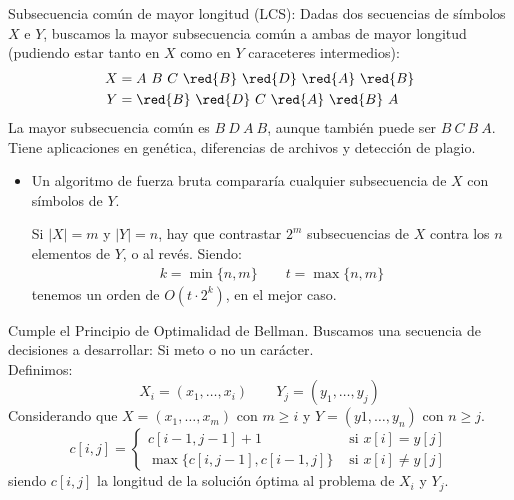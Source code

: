 \begin{ejemplo}
    Subsecuencia común de mayor longitud (LCS): Dadas dos secuencias de símbolos $X$ e $Y$, buscamos la mayor subsecuencia común a ambas de mayor longitud (pudiendo estar tanto en $X$ como en $Y$ caraceteres intermedios):
    \begin{align*}
        X &= A\ B\ C\ \red{B}\ \red{D}\ \red{A}\ \red{B} \\
        Y &= \red{B}\ \red{D}\ C\ \red{A}\ \red{B}\ A
    \end{align*}
    La mayor subsecuencia común es $B\ D\ A\ B$, aunque también puede ser $B\ C\ B\ A$.\newline
    Tiene aplicaciones en genética, diferencias de archivos y detección de plagio.\\

    \begin{itemize}
        \item Un algoritmo de fuerza bruta compararía cualquier subsecuencia de $X$ con símbolos de $Y$. 

            Si $|X| = m$ y $|Y| = n$, hay que contrastar $2^m$ subsecuencias de $X$ contra los $n$ elementos de $Y$, o al revés. Siendo:
            \begin{gather*}
                k = \min \{n,m\} \qquad t = \max\{n,m\}
            \end{gather*}
            tenemos un orden de $O(t\cdot 2^k)$, en el mejor caso.
    \end{itemize}
    Cumple el Principio de Optimalidad de Bellman. Buscamos una secuencia de decisiones a desarrollar: Si meto o no un carácter.\\

    Definimos:
    \begin{equation*}
        X_i = (x_1, \ldots, x_i) \qquad Y_j = (y_1, \ldots, y_j)
    \end{equation*}
    Considerando que $X = (x_1, \ldots, x_m)$ con $m\geq i$ y $Y = (y1, \ldots, y_n)$ con $n\geq j$.
    \begin{equation*}
        c[i,j] = \left\{ \begin{array}{ll}
                c[i-1,j-1] + 1 & \text{\ si\ } x[i] = y[j] \\ 
                \max \{c[i,j-1], c[i-1,j]\} & \text{\ si\ } x[i] \neq y[j]
            \end{array}\right.
    \end{equation*}
    siendo $c[i,j]$ la longitud de la solución óptima al problema de $X_i$ y $Y_j$.\\


\end{ejemplo}

